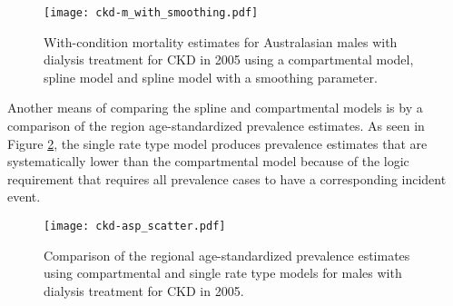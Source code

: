     \begin{figure}[h]
        \begin{center}
            \texttt{[image: ckd-m\_with\_smoothing.pdf]}
            \caption{With-condition mortality estimates for
              Australasian males with dialysis treatment for CKD in
              2005 using a compartmental model, spline model
              and spline model with a smoothing parameter.}
            \label{fig:app-CKD smooth}
        \end{center}
    \end{figure}

Another means of comparing the spline and compartmental
models is by a comparison of the region age-standardized prevalence
estimates.  As seen in Figure \ref{fig:app-CKD asp}, the single rate
type model produces prevalence estimates that are systematically lower
than the compartmental model because of the logic requirement that
requires all prevalence cases to have a corresponding incident event.

    \begin{figure}[h]
        \begin{center}
            \texttt{[image: ckd-asp\_scatter.pdf]}
            \caption{Comparison of the regional age-standardized
              prevalence estimates using compartmental and single rate
              type models for males with dialysis treatment for CKD in
              2005.}
            \label{fig:app-CKD asp}
        \end{center}
    \end{figure}
